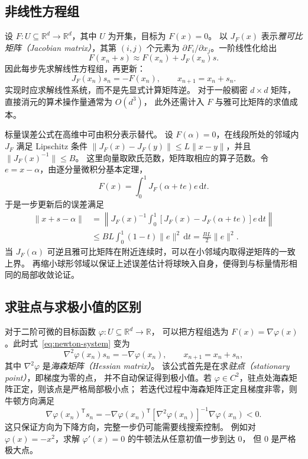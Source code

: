 \documentclass[UTF8,12pt,a4paper,fontset=fandol]{ctexart}
\begin{document}
\subsection{非线性方程组}

设 $F:U\subseteq\mathbb R^d\to\mathbb R^d$，其中 $U$ 为开集，目标为 $F(x)=0$。
以 $J_F(x)$ 表示\emph{雅可比矩阵（Jacobian matrix）}，其第 $(i,j)$ 个元素为
$\partial F_i/\partial x_j$。一阶线性化给出
\[
  F(x_n+s)\approx F(x_n)+J_F(x_n)s.
\]
因此每步先求解线性方程组，再更新：
\begin{equation}\label{eq:newton-system}
  J_F(x_n)s_n=-F(x_n),\qquad x_{n+1}=x_n+s_n.
\end{equation}
实现时应求解线性系统，而不是先显式计算矩阵逆。
对于一般稠密 $d\times d$ 矩阵，直接消元的算术操作量通常为 $O(d^3)$，
此外还需计入 $F$ 与雅可比矩阵的求值成本。

标量误差公式在高维中可由积分表示替代。
设 $F(\alpha)=0$，在线段所处的邻域内 $J_F$ 满足 Lipschitz 条件
$\|J_F(x)-J_F(y)\|\le L\|x-y\|$，并且 $\|J_F(x)^{-1}\|\le B$。
这里向量取欧氏范数，矩阵取相应的算子范数。令 $e=x-\alpha$，由逐分量微积分基本定理，
\[
  F(x)=\int_0^1J_F(\alpha+te)e\,\mathrm dt.
\]
于是一步更新后的误差满足
\begin{align*}
  \|x+s-\alpha\|
  &=\left\|J_F(x)^{-1}\int_0^1
      [J_F(x)-J_F(\alpha+te)]e\,\mathrm dt\right\|\\
  &\le BL\int_0^1(1-t)\|e\|^2\,\mathrm dt
   =\frac{BL}{2}\|e\|^2.
\end{align*}
当 $J_F(\alpha)$ 可逆且雅可比矩阵在附近连续时，可以在小邻域内取得逆矩阵的一致上界。
再缩小球形邻域以保证上述误差估计将球映入自身，便得到与标量情形相同的局部收敛论证。

\subsection{求驻点与求极小值的区别}

对于二阶可微的目标函数 $\varphi:U\subseteq\mathbb R^d\to\mathbb R$，
可以把方程组选为 $F(x)=\nabla\varphi(x)$。此时式~\eqref{eq:newton-system} 变为
\[
  \nabla^2\varphi(x_n)s_n=-\nabla\varphi(x_n),\qquad x_{n+1}=x_n+s_n,
\]
其中 $\nabla^2\varphi$ 是\emph{海森矩阵（Hessian matrix）}。
该公式首先是在求\emph{驻点（stationary point）}，即梯度为零的点，
并不自动保证得到极小值。若 $\varphi\in C^2$，驻点处海森矩阵正定，则该点是严格局部极小点；
若迭代过程中海森矩阵正定且梯度非零，则牛顿方向满足
\[
  \nabla\varphi(x_n)^{\mathsf T}s_n
   =-\nabla\varphi(x_n)^{\mathsf T}
      [\nabla^2\varphi(x_n)]^{-1}\nabla\varphi(x_n)<0.
\]
这只保证方向为下降方向，完整一步仍可能需要线搜索控制。
例如对 $\varphi(x)=-x^2$，求解 $\varphi'(x)=0$ 的牛顿法从任意初值一步到达 $0$，
但 $0$ 是严格极大点。
\end{document}
